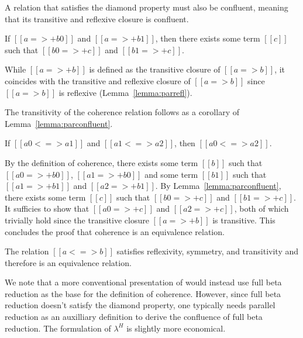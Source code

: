 \documentclass[nonacm]{acmart}
\newcommand{\lang}{$\lambda^H$\xspace}
\begin{document}
A relation that satisfies the
diamond property must also be confluent, meaning that its transitive
and reflexive closure is confluent.
\begin{lemma}
  \label{lemma:parconfluent}
  If $[[a =>+ b0]]$ and $[[a =>+ b1]]$, then there exists some term
  $[[c]]$ such that $[[b0 =>+ c]]$ and $[[b1 =>+ c]]$.
\end{lemma}
While $[[a =>+ b]]$ is defined as the transitive closure of $[[a => b]]$,
it coincides with the transitive and reflexive closure of $[[a => b]]$ since $[[a
=> b]]$ is reflexive (Lemma~\ref{lemma:parrefl}).

The transitivity of the coherence relation follows as a corollary of
Lemma~\ref{lemma:parconfluent}.
\begin{lemma}
  \label{lemma:coherencetrans}
  If $[[a0 <=> a1]]$ and $[[a1 <=> a2]]$, then $[[a0 <=> a2]]$.
\end{lemma}
By the definition of coherence, there exists some term $[[b]]$ such that $[[a0 =>+ b0]]$,
$[[a1 =>+ b0]]$ and some term $[[b1]]$ such that $[[a1 =>+ b1]]$ and
$[[a2 =>+ b1]]$. By Lemma~\ref{lemma:parconfluent}, there exists some
term $[[c]]$ such that $[[b0 =>+ c]]$ and $[[b1 =>+ c]]$. It sufficies
to show that $[[a0 =>+ c]]$ and $[[a2 =>+ c]]$, both of which
trivially hold since the transitive closure $[[a =>+ b]]$ is transitive.
This concludes the proof that coherence is an equivalence relation.
\begin{lemma}
  \label{lemma:coherenceequiv}
  The relation $[[a <=> b]]$ satisfies reflexivity, symmetry, and
  transitivity and therefore is an equivalence relation.
\end{lemma}

We note that a more conventional presentation of
 would instead use full beta reduction as the base for
the definition of coherence. However, since full beta reduction
doesn't satisfy the diamond property, one typically needs parallel
reduction as an auxilliary definition to derive the confluence of full
beta reduction. The formulation of \lang is slightly more economical.
\end{document}
